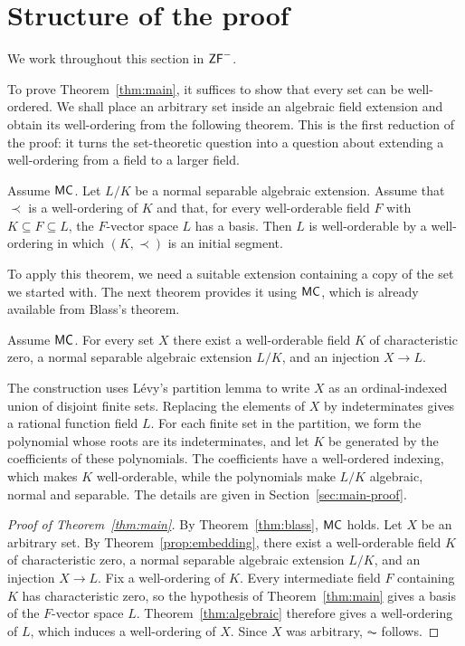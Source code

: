 \section{Structure of the proof}\label{sec:structure}

We work throughout this section in $\mathsf{ZF}^{-}$.

To prove Theorem~\ref{thm:main}, it suffices to show that every set can
be well-ordered. We shall place an arbitrary set inside an algebraic
field extension and obtain its well-ordering from the following
theorem. This is the first reduction of the proof: it turns the
set-theoretic question into a question about extending a well-ordering
from a field to a larger field.

\begin{overviewtheorem}\label{thm:algebraic}
Assume $\mathsf{MC}$. Let $L/K$ be a normal separable algebraic extension.
Assume that $\prec$ is a well-ordering of $K$ and that, for every well-orderable
field $F$ with $K\subseteq F\subseteq L$, the $F$-vector space $L$ has a basis.
Then $L$ is well-orderable by a well-ordering in which $(K, \prec)$ is an initial segment.
\end{overviewtheorem}

To apply this theorem, we need a suitable extension containing a copy
of the set we started with. The next theorem provides it using
$\mathsf{MC}$, which is already available from Blass's theorem.

\begin{overviewtheorem}\label{prop:embedding}
Assume $\mathsf{MC}$. For every set $X$ there exist a well-orderable field $K$
of characteristic zero, a normal separable algebraic extension $L/K$,
and an injection $X\to L$.
\end{overviewtheorem}

The construction uses L\'evy's partition lemma to write $X$ as an
ordinal-indexed union of disjoint finite sets. Replacing the elements
of $X$ by indeterminates gives a rational function field $L$. For each
finite set in the partition, we form the polynomial whose roots are its
indeterminates, and let $K$ be generated by the coefficients of these
polynomials. The coefficients have a well-ordered indexing, which
makes $K$ well-orderable, while the polynomials make $L/K$ algebraic,
normal and separable. The details are given in
Section~\ref{sec:main-proof}.

\begin{proof}[Proof of Theorem~\ref{thm:main}]
By Theorem~\ref{thm:blass}, $\mathsf{MC}$ holds. Let $X$ be an arbitrary set.
By Theorem~\ref{prop:embedding}, there exist a well-orderable
field $K$ of characteristic zero, a normal separable algebraic
extension $L/K$, and an injection $X\to L$.
Fix a well-ordering of $K$. Every intermediate field $F$ containing
$K$ has characteristic zero, so the hypothesis of
Theorem~\ref{thm:main} gives a basis of the $F$-vector space $L$.
Theorem~\ref{thm:algebraic} therefore gives a well-ordering of $L$,
which induces a well-ordering of $X$. Since $X$ was arbitrary,
$\AC$ follows.
\end{proof}


